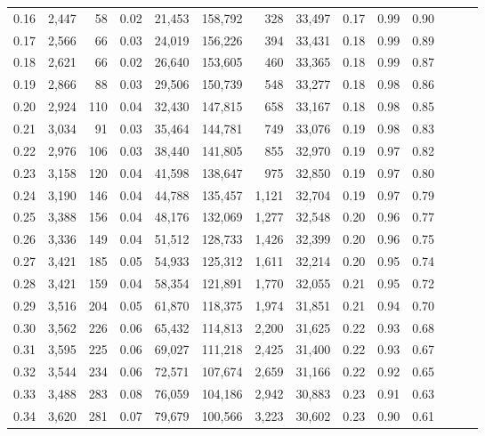 \begin{tabular}{rrrrrrrrrrrrrr}
0.16 &  2,447 &   58 &  0.02 &   21,453 &  158,792 &     328 &  33,497 &  0.17 &  0.99 &      0.90 \\
0.17 &  2,566 &   66 &  0.03 &   24,019 &  156,226 &     394 &  33,431 &  0.18 &  0.99 &      0.89 \\
0.18 &  2,621 &   66 &  0.02 &   26,640 &  153,605 &     460 &  33,365 &  0.18 &  0.99 &      0.87 \\
0.19 &  2,866 &   88 &  0.03 &   29,506 &  150,739 &     548 &  33,277 &  0.18 &  0.98 &      0.86 \\
0.20 &  2,924 &  110 &  0.04 &   32,430 &  147,815 &     658 &  33,167 &  0.18 &  0.98 &      0.85 \\
0.21 &  3,034 &   91 &  0.03 &   35,464 &  144,781 &     749 &  33,076 &  0.19 &  0.98 &      0.83 \\
0.22 &  2,976 &  106 &  0.03 &   38,440 &  141,805 &     855 &  32,970 &  0.19 &  0.97 &      0.82 \\
0.23 &  3,158 &  120 &  0.04 &   41,598 &  138,647 &     975 &  32,850 &  0.19 &  0.97 &      0.80 \\
0.24 &  3,190 &  146 &  0.04 &   44,788 &  135,457 &   1,121 &  32,704 &  0.19 &  0.97 &      0.79 \\
0.25 &  3,388 &  156 &  0.04 &   48,176 &  132,069 &   1,277 &  32,548 &  0.20 &  0.96 &      0.77 \\
0.26 &  3,336 &  149 &  0.04 &   51,512 &  128,733 &   1,426 &  32,399 &  0.20 &  0.96 &      0.75 \\
0.27 &  3,421 &  185 &  0.05 &   54,933 &  125,312 &   1,611 &  32,214 &  0.20 &  0.95 &      0.74 \\
0.28 &  3,421 &  159 &  0.04 &   58,354 &  121,891 &   1,770 &  32,055 &  0.21 &  0.95 &      0.72 \\
0.29 &  3,516 &  204 &  0.05 &   61,870 &  118,375 &   1,974 &  31,851 &  0.21 &  0.94 &      0.70 \\
0.30 &  3,562 &  226 &  0.06 &   65,432 &  114,813 &   2,200 &  31,625 &  0.22 &  0.93 &      0.68 \\
0.31 &  3,595 &  225 &  0.06 &   69,027 &  111,218 &   2,425 &  31,400 &  0.22 &  0.93 &      0.67 \\
0.32 &  3,544 &  234 &  0.06 &   72,571 &  107,674 &   2,659 &  31,166 &  0.22 &  0.92 &      0.65 \\
0.33 &  3,488 &  283 &  0.08 &   76,059 &  104,186 &   2,942 &  30,883 &  0.23 &  0.91 &      0.63 \\
0.34 &  3,620 &  281 &  0.07 &   79,679 &  100,566 &   3,223 &  30,602 &  0.23 &  0.90 &      0.61 \\

\end{tabular}
